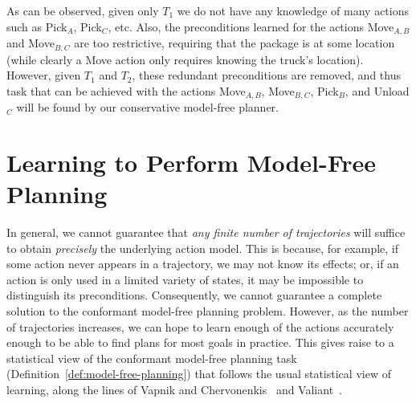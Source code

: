 \documentclass{article}
\begin{document}
	
	As can be observed, given only $T_1$ we do not have any knowledge of many actions such as Pick$_A$, Pick$_C$, etc. Also, the preconditions learned for the actions Move$_{A,B}$ 
	and Move$_{B,C}$ are too restrictive, requiring that the package is at some location (while clearly a Move action only requires knowing the truck's location). However, given $T_1$ and $T_2$, these redundant preconditions are removed, and thus task that can be achieved with the actions Move$_{A,B}$, Move$_{B,C}$, Pick$_B$, and Unload$_C$ will be found by our conservative model-free planner. 
	
	
	
	\section{Learning to Perform Model-Free Planning}
	In general, we cannot guarantee that {\em any finite number of trajectories} will suffice to obtain {\em precisely} the underlying action model. This is because, for example, if some action never appears in a trajectory, we may not know its effects; or, if an action is only used in a limited variety of states, it may be impossible to distinguish its preconditions. Consequently, we cannot guarantee a complete solution to the conformant model-free planning problem. However, as the number of trajectories increases, we can hope to learn enough of the actions accurately enough to be able to find plans for most goals in practice. This gives raise to a statistical view of the conformant model-free planning task (Definition~\ref{def:model-free-planning}) that follows the usual statistical view of learning, along the lines of Vapnik and Chervonenkis~ and Valiant~.  %
	
\end{document}
